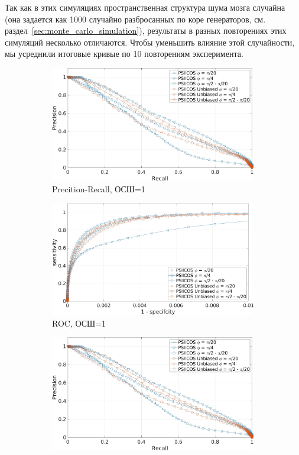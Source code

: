 Так как в этих симуляциях пространственная структура шума мозга случайна
(она задается как 1000 случайно разбросанных по коре генераторов, см.
раздел~\ref{sec:monte_carlo_simulation}), результаты в разных повторениях
этих симуляций несколько отличаются. Чтобы уменьшить влияние этой случайности,
мы усреднили итоговые кривые по 10 повторениям эксперимента.

\begin{figure}[htbp]
    \begin{subfigure}[t]{0.5\textwidth}
        \includegraphics[width=0.99\textwidth]{../images/pre_rec_3_ntw_snr_1.jpg}
        \caption{Precition-Recall, ОСШ=1}\label{fig:psiicos_vs_unbiased_3_ntw_a}
    \end{subfigure}
    \begin{subfigure}[t]{0.5\textwidth}
        \includegraphics[width=0.99\textwidth]{../images/roc_3_ntw_snr_1.jpg}
        \caption{ROC, ОСШ=1}\label{fig:psiicos_vs_unbiased_3_ntw_b}
    \end{subfigure}
    \begin{subfigure}[t]{0.5\textwidth}
        \includegraphics[width=0.99\textwidth]{../images/pre_rec_3_ntw_snr_1.jpg}

\end{subfigure}
\end{figure}
